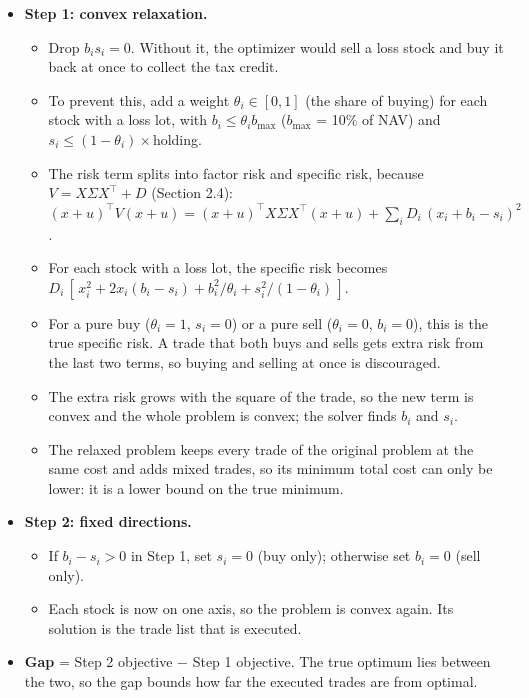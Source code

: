 \documentclass[
  11pt,
]{article}
\providecommand{\tightlist}{%
  \setlength{\itemsep}{0pt}\setlength{\parskip}{0pt}}
\begin{document}
\begin{itemize}
\tightlist
\item
  \textbf{Step 1: convex relaxation.}

  \begin{itemize}
  \tightlist
  \item
    Drop \(b_i s_i = 0\). Without it, the optimizer would sell a loss stock and buy it back at once to collect the tax credit.
  \item
    To prevent this, add a weight \(\theta_i \in [0,1]\) (the share of buying) for each stock with a loss lot, with \(b_i \le \theta_i b_{\max}\) (\(b_{\max}\) = 10\% of NAV) and \(s_i \le (1-\theta_i)\times\)holding.
  \item
    The risk term splits into factor risk and specific risk, because \(V = X\Sigma X^\top + D\) (Section 2.4): \((x+u)^\top V (x+u) = (x+u)^\top X\Sigma X^\top (x+u) + \sum_i D_i\,(x_i + b_i - s_i)^2\).
  \item
    For each stock with a loss lot, the specific risk becomes \(D_i\,[\,x_i^2 + 2x_i(b_i - s_i) + b_i^2/\theta_i + s_i^2/(1-\theta_i)\,]\).
  \item
    For a pure buy (\(\theta_i = 1\), \(s_i = 0\)) or a pure sell (\(\theta_i = 0\), \(b_i = 0\)), this is the true specific risk. A trade that both buys and sells gets extra risk from the last two terms, so buying and selling at once is discouraged.
  \item
    The extra risk grows with the square of the trade, so the new term is convex and the whole problem is convex; the solver finds \(b_i\) and \(s_i\).
  \item
    The relaxed problem keeps every trade of the original problem at the same cost and adds mixed trades, so its minimum total cost can only be lower: it is a lower bound on the true minimum.
  \end{itemize}
\item
  \textbf{Step 2: fixed directions.}

  \begin{itemize}
  \tightlist
  \item
    If \(b_i - s_i > 0\) in Step 1, set \(s_i = 0\) (buy only); otherwise set \(b_i = 0\) (sell only).
  \item
    Each stock is now on one axis, so the problem is convex again. Its solution is the trade list that is executed.
  \end{itemize}
\item
  \textbf{Gap} = Step 2 objective − Step 1 objective. The true optimum lies between the two, so the gap bounds how far the executed trades are from optimal.
\end{itemize}
\end{document}
